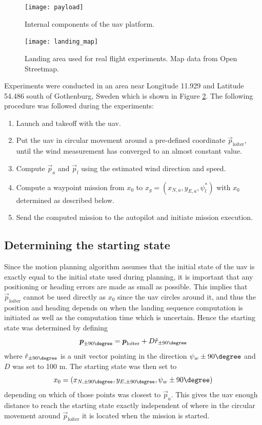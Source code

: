 \begin{figure}[H]
    \centering
    \texttt{[image: payload]}
    \caption{Internal components of the \ac{uav} platform.}
    \label{fig:payload}
\end{figure}

\begin{figure}
    \begin{center}
        \texttt{[image: landing\_map]}
    \end{center}
    \caption{Landing area used for real flight experiments. Map data from Open Streetmap.}
    \label{fig:real_land_area}
\end{figure}

Experiments were conducted in an area near Longitude 11.929 and Latitude 54.486 south of Gothenburg, Sweden which is shown in Figure \ref{fig:real_land_area}.
The following procedure was followed during the experiments:
\begin{enumerate}
    \item Launch and takeoff with the \ac{uav}.
    \item Put the \ac{uav} in circular movement around a pre-defined coordinate $\vec{p}_{\text{loiter}}$, until the wind measurement has converged to an almost constant value.
    \item Compute $\vec{p}_a$ and $\vec{p}_l$ using the estimated wind direction and speed.
    \item Compute a waypoint mission from $x_0$ to $x_g=(x_{N,a},y_{E,a},\psi_l^*)$ with $x_0$ determined as described below.
    \item Send the computed mission to the autopilot and initiate mission execution.
\end{enumerate}

\subsection{Determining the starting state}
Since the motion planning algorithm assumes that the initial state of the \ac{uav} is exactly equal to the initial state used during planning, it is important 
that any positioning or heading errors are made as small as possible. This implies that $\vec{p}_{\text{loiter}}$ cannot be used directly as $x_0$ since the \ac{uav} circles around it, and thus 
the position and heading depends on when the landing sequence computation is initiated as well as the computation time which is uncertain.
Hence the starting state was determined by defining
\begin{equation}
    \vec{p}_{\pm90\degree} = \vec{p}_{\text{loiter}} + D\hat{r}_{\pm90\degree}
\end{equation}
where $\hat{r}_{\pm90\degree}$ is a unit vector pointing in the direction $\winddir\pm90\degree$ and $D$ was set to 100 m. The starting state was then set to
\begin{equation}
    x_0 = (x_{N,\pm90\degree},y_{E,\pm90\degree},\winddir\pm90\degree)
\end{equation}
depending on which of those points was closest to $\vec{p}_a$. This gives the \ac{uav} enough distance to reach the starting state exactly independent 
of where in the circular movement around $\vec{p}_{\text{loiter}}$ it is located when the mission is started.


